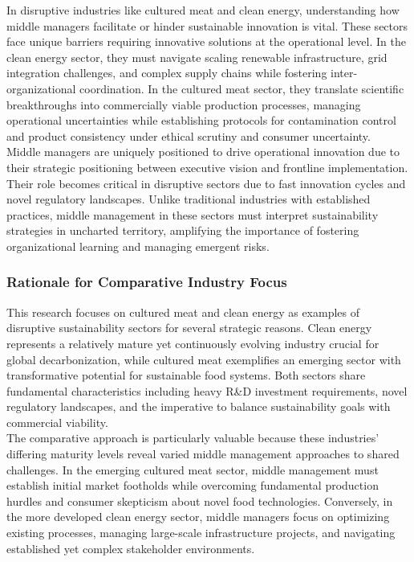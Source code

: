 	In disruptive industries like cultured meat and clean energy, understanding how middle managers facilitate or hinder sustainable innovation is vital. These sectors face unique barriers requiring innovative solutions at the operational level. In the clean energy sector, they must navigate scaling renewable infrastructure, grid integration challenges, and complex supply chains while fostering inter-organizational coordination. In the cultured meat sector, they translate scientific breakthroughs into commercially viable production processes, managing operational uncertainties while establishing protocols for contamination control and product consistency under ethical scrutiny and consumer uncertainty. \\
	
	Middle managers are uniquely positioned to drive operational innovation due to their strategic positioning between executive vision and frontline implementation. Their role becomes critical in disruptive sectors due to fast innovation cycles and novel regulatory landscapes. Unlike traditional industries with established practices, middle management in these sectors must interpret sustainability strategies in uncharted territory, amplifying the importance of fostering organizational learning and managing emergent risks. \\
	
	\subsubsection{Rationale for Comparative Industry Focus}
	This research focuses on cultured meat and clean energy as examples of disruptive sustainability sectors for several strategic reasons. Clean energy represents a relatively mature yet continuously evolving industry crucial for global decarbonization, while cultured meat exemplifies an emerging sector with transformative potential for sustainable food systems. Both sectors share fundamental characteristics including heavy R\&D investment requirements, novel regulatory landscapes, and the imperative to balance sustainability goals with commercial viability. \\
	
	The comparative approach is particularly valuable because these industries’ differing maturity levels reveal varied middle management approaches to shared challenges. In the emerging cultured meat sector, middle management must establish initial market footholds while overcoming fundamental production hurdles and consumer skepticism about novel food technologies. Conversely, in the more developed clean energy sector, middle managers focus on optimizing existing processes, managing large-scale infrastructure projects, and navigating established yet complex stakeholder environments. \\
	
